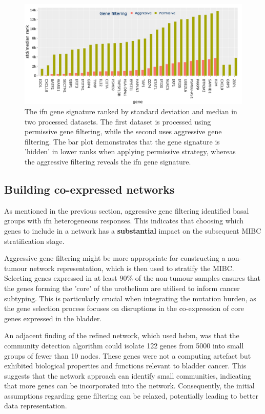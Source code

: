 \begin{figure}[!htb]
    \centering
    \includegraphics[width=1.0\textwidth,keepaspectratio]{Sections/Gene_Sel/ifng_ranks.png}
    \caption{The \acrshort{ifn} gene signature \citep{Baker2022-bj} ranked by standard deviation and median in two processed datasets. The first dataset is processed using permissive gene filtering, while the second uses aggressive gene filtering. The bar plot demonstrates that the gene signature is 'hidden' in lower ranks when applying permissive strategy, whereas the aggressive filtering reveals the \acrshort{ifn} gene signature.}
      \label{fig:ifng_rank_genes}
\end{figure}

\subsection*{Building co-expressed networks}

As mentioned in the previous section, aggressive gene filtering identified basal groups with \acrshort{ifn} heterogeneous responses. This indicates that choosing which genes to include in a network has a \textbf{substantial} impact on the subsequent MIBC stratification stage.

Aggressive gene filtering might be more appropriate for constructing a non-tumour network representation, which is then used to stratify the MIBC. Selecting genes expressed in at least 90\% of the non-tumour samples ensures that the genes forming the 'core' of the urothelium are utilised to inform cancer subtyping. This is particularly crucial when integrating the mutation burden, as the gene selection process focuses on disruptions in the co-expression of core genes expressed in the bladder.

An adjacent finding of the refined network, which used \acrshort{hsbm}, was that the community detection algorithm could isolate 122 genes from 5000 into small groups of fewer than 10 nodes. These genes were not a computing artefact but exhibited biological properties and functions relevant to bladder cancer. This suggests that the network approach can identify small communities, indicating that more genes can be incorporated into the network. Consequently, the initial assumptions regarding gene filtering can be relaxed, potentially leading to better data representation.

